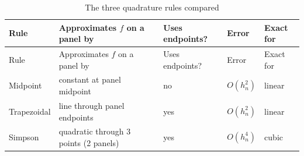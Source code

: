 \documentclass[
  letterpaper,
  DIV=11,
  numbers=noendperiod]{scrreprt}
\begin{document}
\begin{longtable}[]{@{}
  >{\raggedright\arraybackslash}p{}
  >{\raggedright\arraybackslash}p{}
  >{\raggedright\arraybackslash}p{}
  >{\raggedright\arraybackslash}p{}
  >{\raggedright\arraybackslash}p{}@{}}
\caption{The three quadrature rules
compared}\label{tbl-rules-compared}\tabularnewline
\toprule\noalign{}
\begin{minipage}[b]{\linewidth}\raggedright
Rule
\end{minipage} & \begin{minipage}[b]{\linewidth}\raggedright
Approximates \(f\) on a panel by
\end{minipage} & \begin{minipage}[b]{\linewidth}\raggedright
Uses endpoints?
\end{minipage} & \begin{minipage}[b]{\linewidth}\raggedright
Error
\end{minipage} & \begin{minipage}[b]{\linewidth}\raggedright
Exact for
\end{minipage} \\
\midrule\noalign{}
\endfirsthead
\toprule\noalign{}
\begin{minipage}[b]{\linewidth}\raggedright
Rule
\end{minipage} & \begin{minipage}[b]{\linewidth}\raggedright
Approximates \(f\) on a panel by
\end{minipage} & \begin{minipage}[b]{\linewidth}\raggedright
Uses endpoints?
\end{minipage} & \begin{minipage}[b]{\linewidth}\raggedright
Error
\end{minipage} & \begin{minipage}[b]{\linewidth}\raggedright
Exact for
\end{minipage} \\
\midrule\noalign{}
\endhead
\bottomrule\noalign{}
\endlastfoot
Midpoint & constant at panel midpoint & no & \(O(h_n^2)\) & linear \\
Trapezoidal & line through panel endpoints & yes & \(O(h_n^2)\) &
linear \\
Simpson & quadratic through 3 points (2 panels) & yes & \(O(h_n^4)\) &
cubic \\
\end{longtable}
\end{document}
